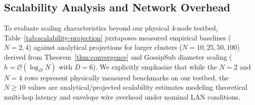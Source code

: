 \begin{table}[!t]
\caption{System Resource and Memory Footprint}
\label{tab:resource-footprint}
\centering
{}
\end{table}

\subsection{Scalability Analysis and Network Overhead}
\label{sec:eval-scalability}

To evaluate scaling characteristics beyond our physical 4-node testbed, Table~\ref{tab:scalability-projection} juxtaposes measured empirical baselines ($N=2, 4$) against analytical projections for larger clusters ($N=10, 25, 50, 100$) derived from Theorem~\ref{thm:convergence} and GossipSub diameter scaling ($h = \mathcal{O}(\log_D N)$ with $D=6$). We explicitly emphasize that while the $N=2$ and $N=4$ rows represent physically measured benchmarks on our testbed, the $N \ge 10$ values are analytical/projected scalability estimates modeling theoretical multi-hop latency and envelope wire overhead under nominal LAN conditions.

